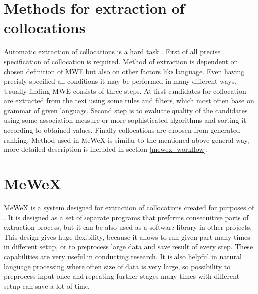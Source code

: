 \section{Methods for extraction of collocations} \label{extraction_method}
Automatic extraction of collocations is a hard task \cite{ramisch}. First of all precise specification of collocation is required.
Method of extraction is dependent on chosen definition of MWE but also on other factors like language. 
Even having precisly specified all conditions it may be performed in many different ways. 
Usually finding MWE consists of three steps. At first candidates for collocation are extracted from the text using some rules and filters, 
which most often base on grammar of given language. Second step is to evaluate quality of the candidates 
using some association measure or more sophisticated algorithms and sorting it according to obtained values. 
Finally collocations are choosen from generated ranking. Method used in MeWeX is similar to the mentioned above general way, 
more detailed description is included in section \ref{mewex_workflow}.

\section{MeWeX}
MeWeX is a system designed for extraction of collocations created for purposes of \cite{mgr}. It is designed as a set of separate programs 
that preforms consecuitive parts of extraction process, but it can be also used as a software library in other projects. 
This design gives huge flexibility, because it allows to run given part many times in different setup, 
or to preprocess large data and save result of every step. These capabilities are very useful in conducting research. 
It is also helpful in natural language processing where often size of data is very large, so possibility 
to preprocess input once and repeating further stages many times with different setup can save a lot of time.

